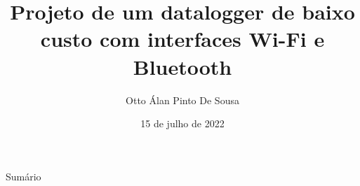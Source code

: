 \documentclass{libs/ufc_format}
\title[Projeto Datalogger]{\textbf{Projeto de um datalogger de baixo custo com interfaces Wi-Fi e Bluetooth}}
\author{Otto Álan Pinto De Sousa}
\institute[UFC]{
    \normalsize{\email{ottolopes20@gmail.com}}
    \newline
    \department{Departamento de Engenharia de Teleinformática}
    \newline
    \ufc
}
\date{15 de julho de 2022}
\begin{document}


\begin{frame}{}
    \maketitle
\end{frame}

\begin{frame}{Sumário}
    \begin{multicols}{2}
        \tableofcontents
    \end{multicols}
\end{frame}

% 

% 









% 
\end{document}

